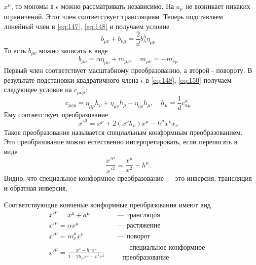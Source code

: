 \documentclass[a4paper,12pt]{article}
\theoremstyle{definition}
\theoremstyle{definition}
\theoremstyle{definition}
\begin{document}
$x^{\mu}$, то мономы в $\epsilon$ можно рассматривать независимо. На $a_{\mu}$ не возникает никаких
ограничений. Этот член соответствует трансляциям. Теперь подставляем линейный член в \eqref{eq:147},
\eqref{eq:148} и получаем условие 
\begin{equation}
  \label{eq:158}
  b_{\mu\nu}+b_{\nu\mu}=\frac{2}{d}b^{\lambda}_{\lambda}\eta_{\mu\nu}
\end{equation}
То есть $b_{\mu\nu}$ можно записать в виде
\begin{equation}
  \label{eq:159}
  b_{\mu\nu}=\alpha \eta_{\mu\nu} +m_{\mu\nu},\quad m_{\mu\nu}=-m_{\nu\mu}
\end{equation}
Первый член соответствует масштабному преобразованию, а второй - повороту. 
В результате подстановки квадратичного члена $\epsilon$ в \eqref{eq:148}, \eqref{eq:150} получаем
следующее условие на $c_{\mu\nu\rho}$: 
\begin{equation}
  \label{eq:160}
  c_{\mu\nu\rho}=\eta_{\mu\rho} h_{\nu} +\eta_{\mu\nu}h_{\rho}-\eta_{\nu\rho}h_{\mu}, \quad h_{\mu}=\frac{1}{d} c^{\alpha}_{\alpha\mu}
\end{equation}
Ему соответствует преобразование
\begin{equation}
  \label{eq:161}
  x'^{\mu}=x^{\mu}+2 (x^{\nu}h_{\nu})x^{\mu} -h^{\mu} x^{\nu}x_{\nu}
\end{equation}
Такое преобразование называется специальным конформным преобразованием.
Это преобразование можно естественно интерпретировать, если переписать в виде
\begin{equation}
  \label{eq:162}
  \frac{x'^{\mu}}{x'^2}=\frac{x^{\mu}}{x^2}-h^{\mu}.
\end{equation}
Видно, что специальное конформное преобразование --- это инверсия, трансляция и обратная инверсия.  

Соответствующие конченые конформные преобразования имеют вид
\begin{eqnarray}
  \label{eq:163}
  x'^{\mu}=x^{\mu}+a^{\mu}&\quad \mbox{--- трансляция}\\
  x'^{\mu}=\alpha x^{\mu} &\quad \mbox{--- растяжение}\\
  x'^{\mu}=m^{\mu}_{\nu} x^{\nu} &\quad \mbox{--- поворот}\\
  x'^{\mu}=\frac{x^{\mu}-h^{\mu}x^2}{1-2h_{\mu}x^{\mu}+h^2 x^2}  & \quad \begin{array}{c}\mbox{--- специальное конформное}\\ \mbox{ преобразование}\end{array}
\end{eqnarray}
\end{document}
